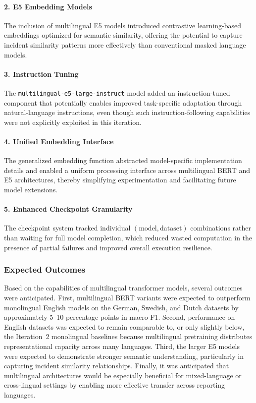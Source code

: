 \documentclass[11pt, titlepage, bibliography=totoc]{scrreprt}
\begin{document}
\paragraph{2. E5 Embedding Models}
The inclusion of multilingual E5 models introduced contrastive learning-based embeddings optimized for semantic similarity, offering the potential to capture incident similarity patterns more effectively than conventional masked language models.

\paragraph{3. Instruction Tuning}
The \texttt{multilingual-e5-large-instruct} model added an instruction-tuned component that potentially enables improved task-specific adaptation through natural-language instructions, even though such instruction-following capabilities were not explicitly exploited in this iteration.

\paragraph{4. Unified Embedding Interface}
The generalized embedding function abstracted model-specific implementation details and enabled a uniform processing interface across multilingual BERT and E5 architectures, thereby simplifying experimentation and facilitating future model extensions.

\paragraph{5. Enhanced Checkpoint Granularity}
The checkpoint system tracked individual \((\text{model}, \text{dataset})\) combinations rather than waiting for full model completion, which reduced wasted computation in the presence of partial failures and improved overall execution resilience.

\subsubsection{Expected Outcomes}
Based on the capabilities of multilingual transformer models, several outcomes were anticipated. First, multilingual BERT variants were expected to outperform monolingual English models on the German, Swedish, and Dutch datasets by approximately 5--10 percentage points in macro-F1. Second, performance on English datasets was expected to remain comparable to, or only slightly below, the Iteration~2 monolingual baselines because multilingual pretraining distributes representational capacity across many languages. Third, the larger E5 models were expected to demonstrate stronger semantic understanding, particularly in capturing incident similarity relationships. Finally, it was anticipated that multilingual architectures would be especially beneficial for mixed-language or cross-lingual settings by enabling more effective transfer across reporting languages.
\end{document}

